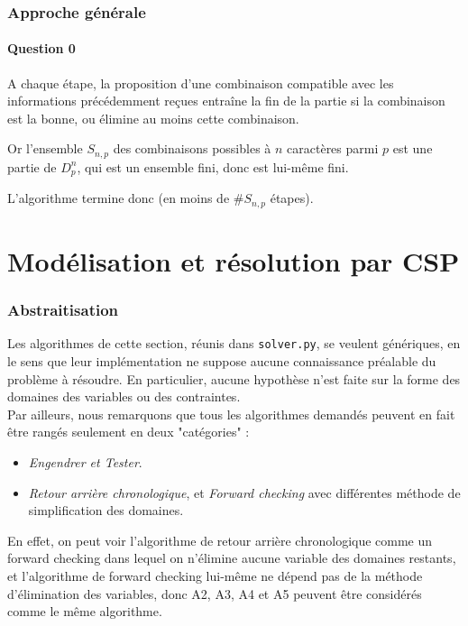 \documentclass[a4paper, 12pt]{report}
\newcommand{\py}[1]{\texttt{#1}}
\begin{document}
\section*{Approche générale}

\subsection*{Question 0}
A chaque étape, la proposition d'une combinaison compatible avec les informations précédemment reçues entraîne la fin de la partie si la combinaison est la bonne, ou élimine au moins cette combinaison. 

Or l'ensemble $S_{n, p}$ des combinaisons possibles à $n$ caractères parmi $p$ est une partie de $D_p^n$, qui est un ensemble fini, donc est lui-même fini.

L'algorithme termine donc (en moins de $\#S_{n, p}$ étapes).



\part*{Modélisation et résolution par CSP}

\section*{Abstraitisation}

Les algorithmes de cette section, réunis dans \py{solver.py}, se veulent génériques, en le sens que leur implémentation ne suppose aucune connaissance préalable du problème à résoudre. En particulier, aucune hypothèse n'est faite sur la forme des domaines des variables ou des contraintes. \\

Par ailleurs, nous remarquons que tous les algorithmes demandés peuvent en fait être rangés seulement en deux "catégories" :

\begin{itemize}
	\item \textit{Engendrer et Tester}.
	
	\item \textit{Retour arrière chronologique}, et \textit{Forward checking} avec différentes méthode de simplification des domaines.
\end{itemize}

En effet, on peut voir l'algorithme de retour arrière chronologique comme un forward checking dans lequel on n'élimine aucune variable des domaines restants, et l'algorithme de forward checking lui-même ne dépend pas de la méthode d'élimination des variables, donc A2, A3, A4 et A5 peuvent être considérés comme le même algorithme. \\
\end{document}
